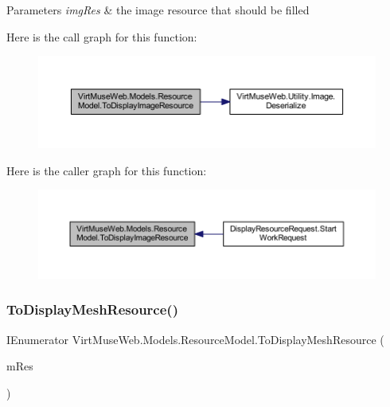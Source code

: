 \begin{DoxyParams}{Parameters}
{\em img\+Res} & the image resource that should be filled\\
\hline
\end{DoxyParams}
Here is the call graph for this function\+:
\nopagebreak
\begin{figure}[H]
\begin{center}
\leavevmode
\includegraphics[width=350pt]{class_virt_muse_web_1_1_models_1_1_resource_model_a4ff757b0ed17663d3d503dbb4decff7b_cgraph}
\end{center}
\end{figure}
Here is the caller graph for this function\+:
\nopagebreak
\begin{figure}[H]
\begin{center}
\leavevmode
\includegraphics[width=350pt]{class_virt_muse_web_1_1_models_1_1_resource_model_a4ff757b0ed17663d3d503dbb4decff7b_icgraph}
\end{center}
\end{figure}
\mbox{\label{class_virt_muse_web_1_1_models_1_1_resource_model_a57f31b86ab776544b1f5480d7efc1a9c}} 
\subsubsection{\texorpdfstring{To\+Display\+Mesh\+Resource()}{ToDisplayMeshResource()}}
{\footnotesize\ttfamily I\+Enumerator Virt\+Muse\+Web.\+Models.\+Resource\+Model.\+To\+Display\+Mesh\+Resource (\begin{DoxyParamCaption}\item[{\mbox{\hyperlink{class_display_mesh_resource}{Display\+Mesh\+Resource}}}]{m\+Res }\end{DoxyParamCaption})}



